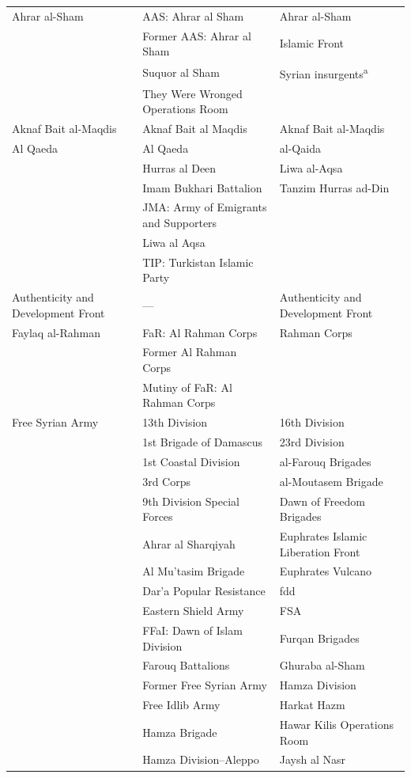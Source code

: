 \begin{longtable}{@{}>{\raggedright\arraybackslash}p{3.15cm} >{\raggedright\arraybackslash}p{6.15cm} >{\raggedright\arraybackslash}p{6.15cm}@{}}
Ahrar al-Sham & AAS: Ahrar al Sham & Ahrar al-Sham \\
 & Former AAS: Ahrar al Sham & Islamic Front \\
 & Suquor al Sham & Syrian insurgents\textsuperscript{a} \\
 & They Were Wronged Operations Room &  \\
\hline
Aknaf Bait al-Maqdis & Aknaf Bait al Maqdis & Aknaf Bait al-Maqdis \\
\hline
Al Qaeda & Al Qaeda & al-Qaida \\
 & Hurras al Deen & Liwa al-Aqsa \\
 & Imam Bukhari Battalion & Tanzim Hurras ad-Din \\
 & JMA: Army of Emigrants and Supporters &  \\
 & Liwa al Aqsa &  \\
 & TIP: Turkistan Islamic Party &  \\
\hline
Authenticity and Development Front & --- & Authenticity and Development Front \\
\hline
Faylaq al-Rahman & FaR: Al Rahman Corps & Rahman Corps \\
 & Former Al Rahman Corps &  \\
 & Mutiny of FaR: Al Rahman Corps &  \\
\hline
Free Syrian Army & 13th Division & 16th Division \\
 & 1st Brigade of Damascus & 23rd Division \\
 & 1st Coastal Division & al-Farouq Brigades \\
 & 3rd Corps & al-Moutasem Brigade \\
 & 9th Division Special Forces & Dawn of Freedom Brigades \\
 & Ahrar al Sharqiyah & Euphrates Islamic Liberation Front \\
 & Al Mu'tasim Brigade & Euphrates Vulcano \\
 & Dar'a Popular Resistance & fdd \\
 & Eastern Shield Army & FSA \\
 & FFaI: Dawn of Islam Division & Furqan Brigades \\
 & Farouq Battalions & Ghuraba al-Sham \\
 & Former Free Syrian Army & Hamza Division \\
 & Free Idlib Army & Harkat Hazm \\
 & Hamza Brigade & Hawar Kilis Operations Room \\
 & Hamza Division--Aleppo & Jaysh al Nasr \\

\end{longtable}

